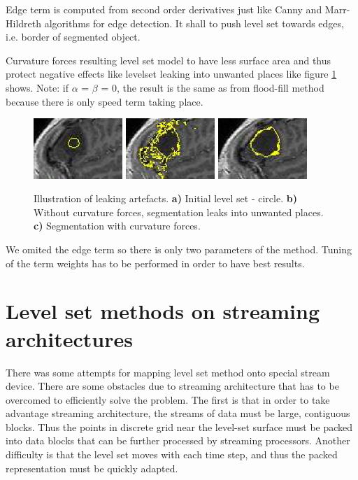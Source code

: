 Edge term is computed from second order derivatives just like Canny and Marr-Hildreth algorithms for edge detection.
It shall to push level set towards edges, i.e. border of segmented object.

Curvature forces resulting level set model to have less surface area and thus protect negative effects like levelset leaking into unwanted places like figure \ref{fg:leaking} shows.
Note: if $\alpha$ = $\beta$ = 0, the result is the same as from flood-fill method because there is only speed term taking place.

\begin{figure}
    \centering
    \includegraphics[width=0.3\textwidth]{data/png/leaking1}
    \includegraphics[width=0.3\textwidth]{data/png/leaking2}
    \includegraphics[width=0.3\textwidth]{data/png/leaking3}
    \caption[Leaking]{Illustration of leaking artefacts.
    \textbf{a)} Initial level set - circle.
    \textbf{b)} Without curvature forces, segmentation leaks into unwanted places.
    \textbf{c)} Segmentation with curvature forces.
}
    \label{fg:leaking}
\end{figure}

We omited the edge term so there is only two parameters of the method.
Tuning of the term weights has to be performed in order to have best results.

\section{Level set methods on streaming architectures}

\par
There was some attempts for mapping level set method onto special stream device.
There are some obstacles due to streaming architecture that has to be overcomed to efficiently solve the problem.
The first is that in order to take advantage streaming architecture, the streams of data must be large, contiguous blocks.
Thus the points in discrete grid near the level-set surface must be packed into data blocks that can be further processed by streaming processors.
Another difficulty is that the level set moves with each time step, and thus the packed representation must be quickly adapted.

